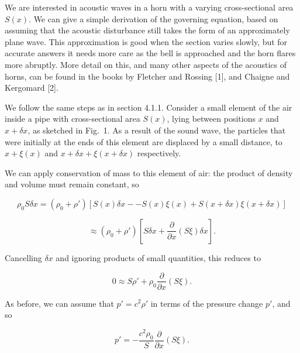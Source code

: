   We are interested in acoustic waves in a horn with a varying cross-sectional 
  area $S(x)$. We can give a simple derivation of the governing equation, based 
  on assuming that the acoustic disturbance still takes the form of an 
  approximately plane wave. This approximation is good when the section varies 
  slowly, but for accurate answers it needs more care as the bell is approached 
  and the horn flares more abruptly. More detail on this, and many other 
  aspects of the acoustics of horns, can be found in the books by Fletcher and 
  Rossing [1], and Chaigne and Kergomard [2]. 

  We follow the same steps as in section 4.1.1. Consider a small element of the 
  air inside a pipe with cross-sectional area $S(x)$, lying between positions 
  $x$ and $x+\delta x$, as sketched in Fig.\ 1. As a result of the sound wave, 
  the particles that were initially at the ends of this element are displaced 
  by a small distance, to $x+\xi(x)$ and $x + \delta x + \xi(x + \delta x)$ 
  respectively. 


  We can apply conservation of mass to this element of air: the product of 
  density and volume must remain constant, so 

  \begin{equation*}\rho_0 S \delta x = (\rho_0 + \rho') \left[ S(x) \delta x -- 
  S(x) \xi(x) +S(x+ \delta x) \xi(x+ \delta x) \right] \end{equation*} 

  \begin{equation*}\approx (\rho_0 + \rho') \left[ S \delta x + 
  \frac{\partial}{\partial x} \left(S \xi \right) \delta x \right] . 
  \tag{1}\end{equation*} 

  Cancelling $\delta x$ and ignoring products of small quantities, this reduces 
  to 

  \begin{equation*}0 \approx S \rho' + \rho_0 \frac{\partial}{\partial x} 
  \left(S \xi \right) . \tag{2}\end{equation*} 

  As before, we can assume that $p' = c^2 \rho'$ in terms of the pressure 
  change $p'$, and so 

  \begin{equation*}p' = -\dfrac{c^2 \rho_0}{S}\frac{\partial}{\partial x} 
  \left(S \xi \right) . \tag{3}\end{equation*} 

